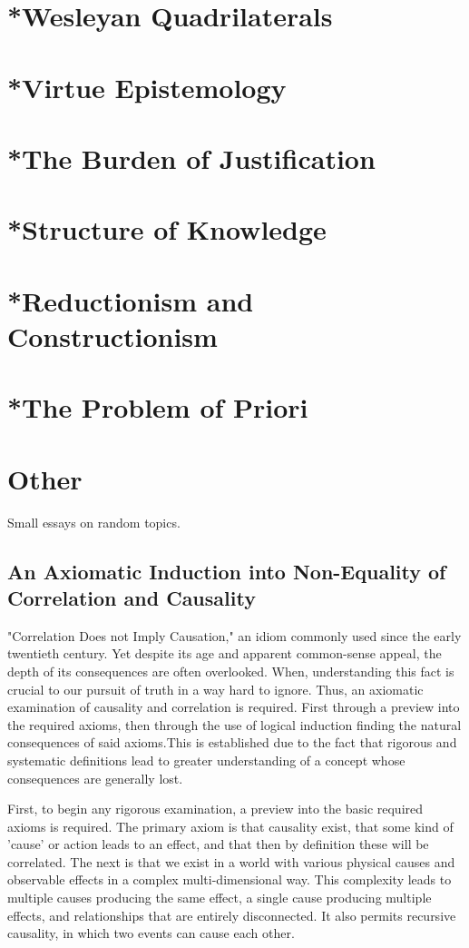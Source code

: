 \section{*Wesleyan Quadrilaterals}
\section{*Virtue Epistemology}
\section{*The Burden of Justification}
\section{*Structure of Knowledge}
\section{*Reductionism and Constructionism}
\section{*The Problem of Priori}
\section{Other}
Small essays on random topics.
\subsection{An Axiomatic Induction into Non-Equality of Correlation and Causality}
\par "Correlation Does not Imply Causation," an idiom commonly used since the early twentieth century. Yet despite its age and apparent common-sense appeal, the depth of its consequences are often overlooked. When, understanding this fact is crucial to our pursuit of truth in a way hard to ignore. Thus, an axiomatic examination of causality and correlation is required. First through a preview into the required axioms, then through the use of logical induction finding the natural consequences of said axioms.This is established due to the fact that rigorous and systematic definitions lead to greater understanding of a concept whose consequences are generally lost.

\par First, to begin any rigorous examination, a preview into the basic required axioms is required. The primary axiom is that causality exist, that some kind of 'cause' or action leads to an effect, and that then by definition these will be correlated. The next is that we exist in a world with various physical causes and observable effects in a complex multi-dimensional way. This complexity leads to multiple causes producing the same effect, a single cause producing multiple effects, and relationships that are entirely disconnected. It also permits recursive causality, in which two events can cause each other.

